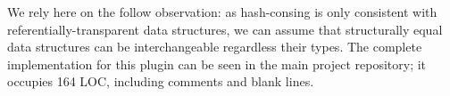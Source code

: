 We rely here on the follow observation: as hash-consing is only consistent with referentially-transparent data structures, we can assume
that structurally equal data structures can be interchangeable regardless their types. The complete implementation for this plugin can be seen in the main project
repository; it occupies 164 LOC, including comments and blank lines.
